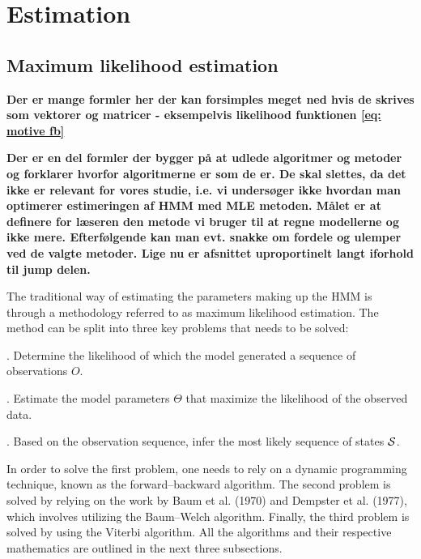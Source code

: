 \section{Estimation}
\label{section: estimation}

\subsection{Maximum likelihood estimation}
\textbf{Der er mange formler her der kan forsimples meget ned hvis de skrives som vektorer og matricer - eksempelvis likelihood funktionen \cref{eq: motive fb}} 

\textbf{Der er en del formler der bygger på at udlede algoritmer og metoder og forklarer hvorfor algoritmerne er som de er. De skal slettes, da det ikke er relevant for vores studie, i.e. vi undersøger ikke hvordan man optimerer estimeringen af HMM med MLE metoden. Målet er at definere for læseren den metode vi bruger til at regne modellerne og ikke mere. Efterfølgende kan man evt. snakke om fordele og ulemper ved de valgte metoder. Lige nu er afsnittet uproportinelt langt iforhold til jump delen.}

The traditional way of estimating the parameters making up the HMM is through a methodology referred to as maximum likelihood estimation. The method can be split into three key problems that needs to be solved:

    . Determine the likelihood of which the model generated a sequence of observations $O$. 
    
    . Estimate the model parameters $\Theta$ that maximize the likelihood of the observed data.

    . Based on the observation sequence, infer the most likely sequence of states $\S$.
\label{subsection: MLE}
 
In order to solve the first problem, one needs to rely on a dynamic programming technique, known as the forward–backward algorithm. The second problem is solved by relying on the work by Baum et al. (1970) and Dempster et al. (1977), which involves utilizing the Baum–Welch algorithm. Finally, the third problem is solved by using the Viterbi algorithm. All the algorithms and their respective mathematics are outlined in the next three subsections. 
 
